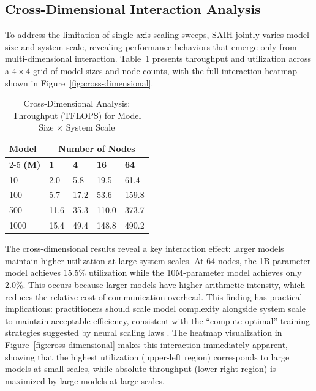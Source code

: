 \documentclass{llncs}
\begin{document}
\subsection{Cross-Dimensional Interaction Analysis}

To address the limitation of single-axis scaling sweeps, SAIH jointly varies model size and system scale, revealing performance behaviors that emerge only from multi-dimensional interaction. Table~\ref{tab:cross-dimensional} presents throughput and utilization across a $4\times4$ grid of model sizes and node counts, with the full interaction heatmap shown in Figure~\ref{fig:cross-dimensional}.

\begin{table}[t]
\centering
\caption{Cross-Dimensional Analysis: Throughput (TFLOPS) for Model Size $\times$ System Scale}
\label{tab:cross-dimensional}
\begin{tabular*}{\columnwidth}{@{\extracolsep{\fill}} lllll @{}}
\toprule
\textbf{Model} & \multicolumn{4}{c}{\textbf{Number of Nodes}} \\
\cmidrule{2-5}
\textbf{(M)} & \textbf{1} & \textbf{4} & \textbf{16} & \textbf{64} \\
\midrule
10 & 2.0 & 5.8 & 19.5 & 61.4 \\
100 & 5.7 & 17.2 & 53.6 & 159.8 \\
500 & 11.6 & 35.3 & 110.0 & 373.7 \\
1000 & 15.4 & 49.4 & 148.8 & 490.2 \\
\bottomrule
\end{tabular*}
\end{table}

The cross-dimensional results reveal a key interaction effect: larger models maintain higher utilization at large system scales. At 64 nodes, the 1B-parameter model achieves 15.5\% utilization while the 10M-parameter model achieves only 2.0\%. This occurs because larger models have higher arithmetic intensity, which reduces the relative cost of communication overhead. This finding has practical implications: practitioners should scale model complexity alongside system scale to maintain acceptable efficiency, consistent with the ``compute-optimal'' training strategies suggested by neural scaling laws \cite{Kaplan2020ScalingLaws}. The heatmap visualization in Figure~\ref{fig:cross-dimensional} makes this interaction immediately apparent, showing that the highest utilization (upper-left region) corresponds to large models at small scales, while absolute throughput (lower-right region) is maximized by large models at large scales.
\end{document}
